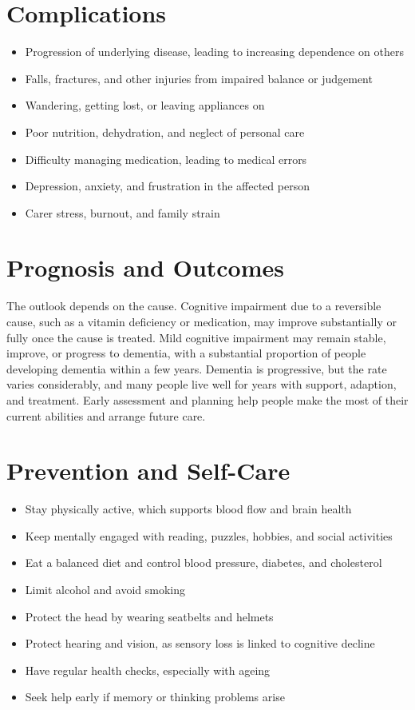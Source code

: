 \section*{Complications}
\begin{itemize}
    \item Progression of underlying disease, leading to increasing dependence on others
    \item Falls, fractures, and other injuries from impaired balance or judgement
    \item Wandering, getting lost, or leaving appliances on
    \item Poor nutrition, dehydration, and neglect of personal care
    \item Difficulty managing medication, leading to medical errors
    \item Depression, anxiety, and frustration in the affected person
    \item Carer stress, burnout, and family strain
\end{itemize}

\section*{Prognosis and Outcomes}
The outlook depends on the cause. Cognitive impairment due to a reversible cause, such as a vitamin deficiency or medication, may improve substantially or fully once the cause is treated. Mild cognitive impairment may remain stable, improve, or progress to dementia, with a substantial proportion of people developing dementia within a few years. Dementia is progressive, but the rate varies considerably, and many people live well for years with support, adaption, and treatment. Early assessment and planning help people make the most of their current abilities and arrange future care.

\section*{Prevention and Self-Care}
\begin{itemize}
    \item Stay physically active, which supports blood flow and brain health
    \item Keep mentally engaged with reading, puzzles, hobbies, and social activities
    \item Eat a balanced diet and control blood pressure, diabetes, and cholesterol
    \item Limit alcohol and avoid smoking
    \item Protect the head by wearing seatbelts and helmets
    \item Protect hearing and vision, as sensory loss is linked to cognitive decline
    \item Have regular health checks, especially with ageing
    \item Seek help early if memory or thinking problems arise
\end{itemize}

